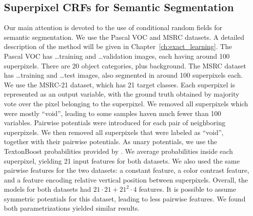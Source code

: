 \subsection{Superpixel CRFs for Semantic Segmentation}
Our main attention is devoted to the use of conditional random fields for
semantic segmentation.  We use the Pascal VOC and MSRC datasets. A detailed
description of the method will be given in Chapter~\ref{ch:exact_learning}.
The Pascal VOC has \ldots training and \ldots validation images, each having
around 100 superpixels. There are 20 object categories, plus background. The %
MSRC dataset has \ldots training and \ldots test images, also segmented in
around 100 superpixels each. We use the MSRC-21 dataset, which has 21 target
classes.
Each superpixel is represented as an output variable, with the ground truth obtained
by majority vote over the pixel belonging to the superpixel. We removed all
superpixels which were mostly ``void'', leading to some samples haven much
fewer than 100 variables.
Pairwise potentials were introduced for each pair of neighboring superpixels.
We then removed all superpixels that were labeled as ``void'', together with
their pairwise potentials.
As unary potentials, we use the TextonBoost probabilities provided by  %
\citet{krahenbuhl2012efficient}.  We average probabilities inside each
superpixel, yielding 21 input features for both datasets.  We also used the
same pairwise features for the two datasets: a constant feature, a color
contrast feature, and a feature encoding relative vertical position between
superpixels.  Overall, the models for both datasets had $21 \cdot 21 + 21^2
\cdot 4$ features.  It is possible to assume symmetric potentials for this
dataset, leading to less pairwise features. We found both parametrizations
yielded similar results.

